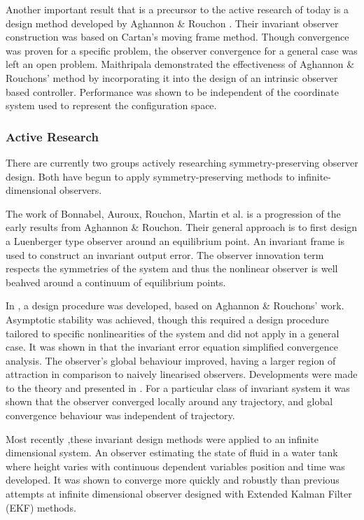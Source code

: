 Another important result that is a precursor to the active research of today is a design method developed by Aghannon \& Rouchon \cite{aghannan2002invariant}. Their invariant observer construction was based on Cartan's moving frame method. Though convergence was proven for a specific problem, the observer convergence for a general case was left an open problem. Maithripala \cite{maithripala2005intrinsic} demonstrated the effectiveness of Aghannon \& Rouchons' method by incorporating it into the design of an intrinsic observer based controller. Performance was shown to be independent of the coordinate system used to represent the configuration space.

\subsubsection{Active Research}
There are currently two groups actively researching symmetry-preserving observer design.  Both have begun to apply symmetry-preserving methods to infinite-dimensional observers.

The work of Bonnabel, Auroux, Rouchon, Martin et al. is a progression of the early results from Aghannon \& Rouchon. Their general approach is to first design a Luenberger type observer around an equilibrium point. An invariant frame is used to construct an invariant output error. The observer innovation term respects the symmetries of the system and thus the nonlinear observer is well beahved around a continuum of equilibrium points. 

In \cite{bonnabel2005invariant}, a design procedure was developed, based on Aghannon \& Rouchons' work. Asymptotic stability was achieved, though this required a design procedure tailored to specific nonlinearities of the system and did not apply in a general case.
It was shown in \cite{bonnabel2008symmetry} that the invariant error equation simplified convergence analysis. The observer's global behaviour improved, having a larger region of attraction in comparison to naively linearised observers.
Developments were made to the theory and presented in \cite{bonnabel2009non}. For a particular class of invariant system it was shown that the observer converged locally around any trajectory, and global convergence behaviour was independent of trajectory.

Most recently \cite{auroux2011symmetry},these invariant design methods were applied to an infinite dimensional system. An observer estimating the state of fluid in a water tank where height varies with continuous dependent variables position and time was developed. It was shown to converge more quickly and robustly than previous attempts at infinite dimensional observer designed with Extended Kalman Filter (EKF) methods.

